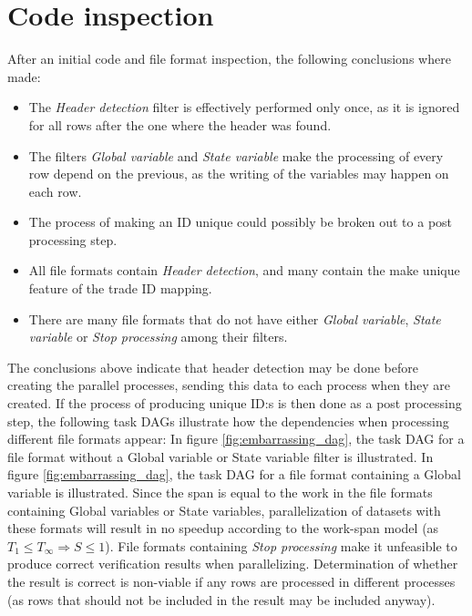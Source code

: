 \section{Code inspection}
After an initial code and file format inspection, the following conclusions where made:
\begin{itemize}
  \item The \textit{Header detection} filter is effectively performed only once, as it is ignored for all rows after the one where the header was found.
  \item The filters \textit{Global variable} and \textit{State variable} make the processing of every row depend on the previous, as the writing of the variables may happen on each row.
  \item The process of making an ID unique could possibly be broken out to a post processing step.
  \item All file formats contain \textit{Header detection}, and many contain the make unique feature of the trade ID mapping.
  \item There are many file formats that do not have either \textit{Global variable}, \textit{State variable} or \textit{Stop processing} among their filters.
\end{itemize}

The conclusions above indicate that header detection may be done before creating the parallel processes, sending this data to each process when they are created.
If the process of producing unique ID:s is then done as a post processing step, the following task DAGs illustrate how the dependencies when processing different
file formats appear: In figure \ref{fig:embarrassing_dag}, the task DAG for a file format without a Global variable or State variable filter is illustrated.
In figure \ref{fig:embarrassing_dag}, the task DAG for a file format containing a Global variable is illustrated. Since the span is equal to the work
in the file formats containing Global variables or State variables, parallelization of datasets with these formats will result in no speedup according to the %
work-span model (as $T_1 \leq T_\infty \Rightarrow S \leq 1$). File formats containing \textit{Stop processing} make it unfeasible to produce correct verification results
when parallelizing. Determination of whether the result is correct is non-viable if any rows are processed in different processes (as rows that should not be included in the result may be included anyway).

